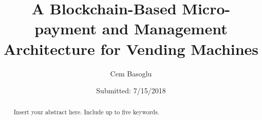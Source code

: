 \documentclass[twocolumn,fleqn,runningheads]{template_files/svjour2}
\begin{document}
\title{A Blockchain-Based Micro-payment and Management Architecture for Vending Machines}

\author{Cem Basoglu}


\date{Submitted: 7/15/2018}

\maketitle

\begin{abstract}
Insert your abstract here. Include up to five keywords.
\end{abstract}







%
\end{document}
